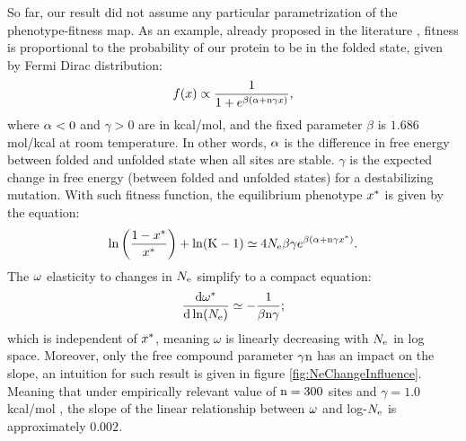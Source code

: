 \documentclass{article}
\begin{document}
So far, our result did not assume any particular parametrization of the phenotype-fitness map.
As an example, already proposed in the literature \cite{Goldstein2011}, fitness is proportional to the probability of our protein to be in the folded state, given by Fermi Dirac distribution: 
\begin{equation}
f(x) \propto \dfrac{1}{1 + e^{\beta (\alpha + \text{n} \gamma x)}}, 
\end{equation}
where $\alpha < 0$ and $\gamma > 0$ are in kcal/mol, and the fixed parameter $\beta$ is $1.686$ mol/kcal at room temperature. In other words, $\alpha$ is the difference in free energy between folded and unfolded state when all sites are stable. $\gamma$ is the expected change in free energy (between folded and unfolded states) for a destabilizing mutation.
With such fitness function, the equilibrium phenotype $x^{*}$ is given by the equation: 
\begin{align}
\ln \left( \frac{1 - x^{*}}{x^{*}} \right) + \ln (\text{K}-1) \simeq 4N_{\mathrm{e}} \beta \gamma e^{\beta (\alpha + \text{n} \gamma x^{*})}.
\label{eq:equilibrium}
\end{align}
The $\omega$ elasticity to changes in $N_{\mathrm{e}}$ simplify to a compact equation: 
\begin{equation}
\frac{ \mathrm{d} \omega^{*}}{\mathrm{d} \ln (N_{\mathrm{e}})} \simeq -\dfrac{1}{\beta \text{n} \gamma};
\end{equation}
which is independent of $x^{*}$, meaning $\omega$ is linearly decreasing with $N_{\mathrm{e}}$ in log space.
Moreover, only the free compound parameter $\gamma \text{n}$ has an impact on the slope, an intuition for such result is given in figure \ref{fig:NeChangeInfluence}.
Meaning that under empirically relevant value of $\text{n}=300$ sites and $\gamma=1.0$ kcal/mol \cite{Zeldovich2007}, the slope of the linear relationship between $\omega$ and log-$N_{\mathrm{e}}$ is approximately $0.002$.
\end{document}
